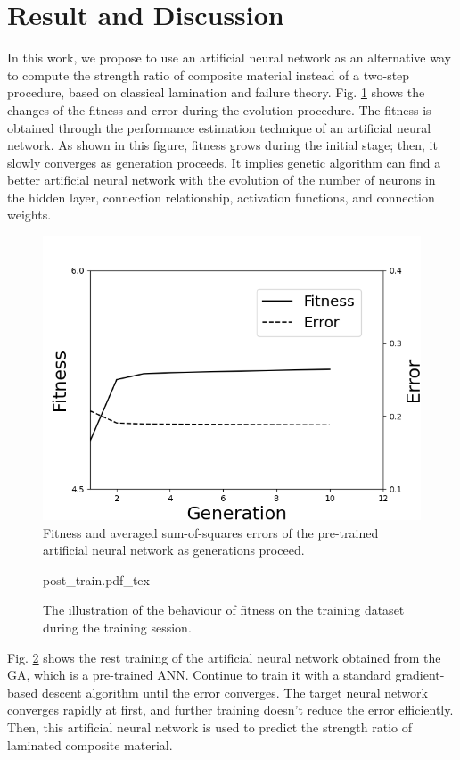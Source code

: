 \section{Result and Discussion}

In this work, we propose to use an artificial neural network as an alternative
way to compute the strength ratio of composite material instead of a two-step
procedure, based on classical lamination and failure theory. Fig.
\ref{fig:ga_nn} shows the changes of the fitness and error during the evolution
procedure. The fitness is obtained through the performance estimation technique
of an artificial neural network. As shown in this figure, fitness grows during
the initial stage; then, it slowly converges as generation proceeds. It implies
genetic algorithm can find a better artificial neural network with the evolution
of the number of neurons in the hidden layer, connection relationship,
activation functions, and connection weights.

\begin{figure}[!tb]
	\includegraphics[width=0.9\linewidth]{./fig/result_ga_ann.png}
	\caption{Fitness and averaged sum-of-squares errors of the pre-trained artificial neural network as generations proceed.}
	\label{fig:ga_nn}
\end{figure}

\begin{figure}[!tb]
	\centering
	\def\svgwidth{\columnwidth}
	{post_train.pdf_tex}
	\caption{The illustration of the behaviour of fitness on the training dataset during the training session.}
	\label{fig:final_train}
\end{figure}

Fig. \ref{fig:final_train} shows the rest training of the artificial neural
network obtained from the GA, which is a pre-trained ANN. Continue to train it
with a standard gradient-based descent algorithm until the error converges. The
target neural network converges rapidly at first, and further training doesn’t
reduce the error efficiently. Then, this artificial neural network is used to
predict the strength ratio of laminated composite material.


